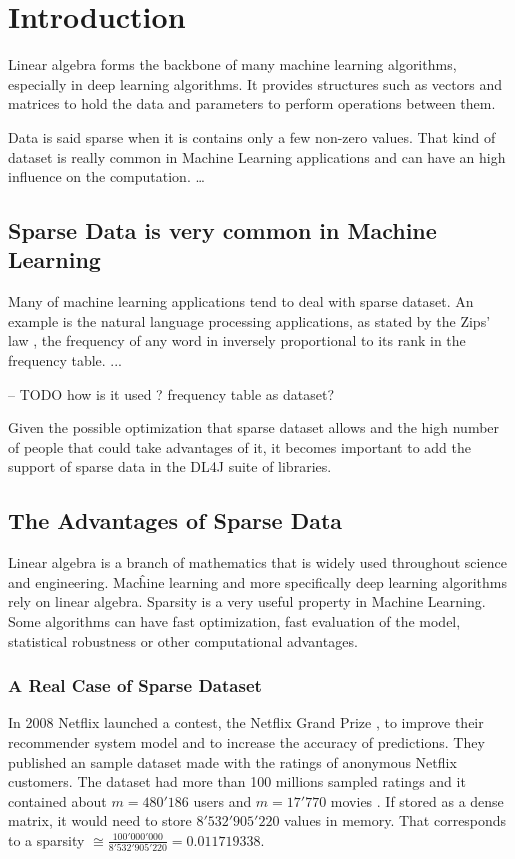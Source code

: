 \chapter{Introduction}


Linear algebra forms the backbone of many machine learning algorithms, especially in deep learning algorithms. It provides structures such as vectors and matrices to hold the data and parameters to perform operations between them. 

Data is said sparse when it is contains only a few non-zero values. That kind of dataset is really common in Machine Learning applications and can have an high influence on the computation. \dots

\section{Sparse Data is very common in Machine Learning}

Many of machine learning applications tend to deal with sparse dataset. An example is the natural language processing applications, as stated by the Zips' law \cite{Zipf}, the frequency of any word in inversely proportional to its rank in the frequency table. ... 

-- TODO how is it used ? frequency table as dataset?


Given the possible optimization that sparse dataset allows and the high number of people that could take advantages of it, it becomes important to add the support of sparse data in the DL4J suite of libraries. 



\section{The Advantages of Sparse Data}
Linear algebra is a branch of mathematics that is widely used throughout science and engineering. Macĥine learning and more specifically deep learning algorithms rely on linear algebra. Sparsity is a very useful property in Machine Learning. Some algorithms can have fast optimization, fast evaluation of the model, statistical robustness or other computational advantages.


\subsection{A Real Case of Sparse Dataset}
In 2008 Netflix launched a contest, the Netflix Grand Prize \cite{netflixgrandprize}, to improve their recommender system model and to increase the accuracy of predictions. They published an sample dataset made with the ratings of anonymous Netflix customers. The dataset had more than 100 millions sampled ratings and it contained about $m=480'186$ users and $m=17'770$ movies \cite{Koren091the}. If stored as a dense matrix, it would need to store $8'532'905'220$ values in memory. That corresponds to a sparsity $\cong \frac{100'000'000}{8'532'905'220} = 0.011719338$.

